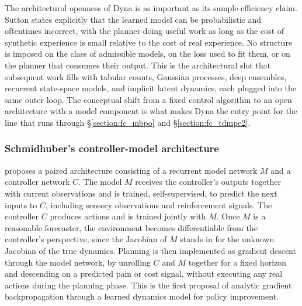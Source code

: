 The architectural openness of Dyna is as important as its sample-efficiency claim. Sutton states explicitly that the learned model can be probabilistic and oftentimes incorrect, with the planner doing useful work as long as the cost of synthetic experience is small relative to the cost of real experience. No structure is imposed on the class of admissible models, on the loss used to fit them, or on the planner that consumes their output. This is the architectural slot that subsequent work fills with tabular counts, Gaussian processes, deep ensembles, recurrent state-space models, and implicit latent dynamics, each plugged into the same outer loop. The conceptual shift from a fixed control algorithm to an open architecture with a model component is what makes Dyna the entry point for the line that runs through \S\ref{section:fc_mbpo} and \S\ref{section:fc_tdmpc2}.

\subsubsection{Schmidhuber's controller-model architecture}
\label{section:fc_origins_schmidhuber}

\citet{Schmidhuber1990} proposes a paired architecture consisting of a recurrent model network $M$ and a controller network $C$. The model $M$ receives the controller's outputs together with current observations and is trained, self-supervised, to predict the next inputs to $C$, including sensory observations and reinforcement signals. The controller $C$ produces actions and is trained jointly with $M$. Once $M$ is a reasonable forecaster, the environment becomes differentiable from the controller's perspective, since the Jacobian of $M$ stands in for the unknown Jacobian of the true dynamics. Planning is then implemented as gradient descent through the model network, by unrolling $C$ and $M$ together for a fixed horizon and descending on a predicted pain or cost signal, without executing any real actions during the planning phase. This is the first proposal of analytic gradient backpropagation through a learned dynamics model for policy improvement.

